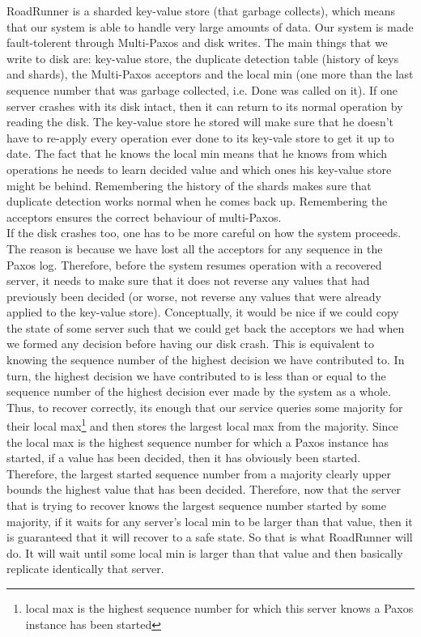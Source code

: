 \documentclass[a4paper]{article}
\begin{document}
RoadRunner is a sharded key-value store (that garbage collects), which means that our system is able to handle very large amounts of data.
Our system is made fault-tolerent through Multi-Paxos and disk writes.
The main things that we write to disk are: key-value store, the duplicate detection table (history of keys and shards), the Multi-Paxos acceptors and the local min (one more than the last sequence number that was garbage collected, i.e. Done was called on it).
If one server crashes with its disk intact, then it can return to its normal operation by reading the disk.
The key-value store he stored will make sure that he doesn't have to re-apply every operation ever done to its key-vale store to get it up to date.
The fact that he knows the local min means that he knows from which operations he needs to learn decided value and which ones his key-value store might be behind. 
Remembering the history of the shards makes sure that duplicate detection works normal when he comes back up.
Remembering the acceptors  ensures the correct behaviour of multi-Paxos.\\
\indent If the disk crashes too, one has to be more careful on how the system proceeds.
The reason is because we have lost all the acceptors for any sequence in the Paxos log.
Therefore, before the system resumes operation with a recovered server, it needs to make sure that it does not reverse any values that had previously been decided (or worse, not reverse any values that were already applied to the key-value store).
Conceptually, it would be nice if we could copy the state of some server such that we could get back the acceptors we had when we formed any decision before having our disk crash.
This is equivalent to knowing the sequence number of the highest decision we have contributed to. 
In turn, the highest decision we have contributed to is less than or equal to the sequence number of the highest decision ever made by the system as a whole.
Thus, to recover correctly, its enough that our service queries some majority for their 
local max\footnote{local max is the highest sequence number for which this server knows a Paxos instance has been started} 
and then stores the largest local max from the majority.
Since the local max is the highest sequence number for which a Paxos instance has started, if a value has been decided, then it has obviously been started.
Therefore, the largest started sequence number from a majority clearly upper bounds the highest value that has been decided.
Therefore, now that the server that is trying to recover knows the largest sequence number started by some majority, if it waits for any server's local min to be larger than that value, then it is guaranteed that it will recover to a safe state.
So that is what RoadRunner will do.
It will wait until some local min is larger than that value and then basically replicate identically that server.
\end{document}
